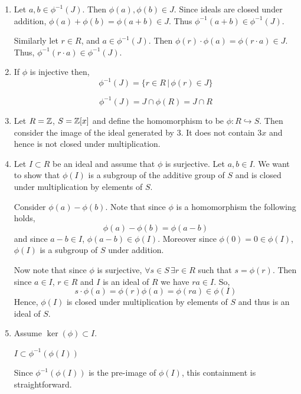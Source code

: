 \documentclass[Notebook.tex]{subfiles}
\begin{document}
\begin{solution}
    \bbni

    \begin{enumerate}[label=(\alph*),ref=\theenumi\alph*]
        \item Let $a, b \in \phi^{-1}(J)$. Then $\phi(a), \phi(b) \in J$. Since ideals are closed under addition, $\phi(a) + \phi(b) = \phi(a+b) \in J$. Thus $\phi^{-1}(a+b) \in \phi^{-1}(J)$. 
        
        Similarly let $r \in R$, and $a \in \phi^{-1}(J)$. Then $\phi(r) \cdot \phi(a)  = \phi(r \cdot a)\in J$. Thus, $\phi^{-1}(r \cdot a) \in \phi^{-1}(J)$. 

        \item If $\phi$ is injective then, 
        \[\phi^{-1}(J) = \{r \in R \, | \, \phi(r) \in J \}\]

        \[\phi^{-1}(J) = J \cap \phi(R) = J \cap R\]

        \item Let $R = \mathbb Z$, $S = \mathbb Z[x]$ and define the homomorphism to be $\phi: R \hookrightarrow S$. Then consider the image of the ideal generated by $3$. It does not contain $3x$ and hence is not closed under multiplication.  
        
        \item Let $I \subset R$ be an ideal and assume that $\phi$ is surjective. Let $a, b \in I$. We want to show that $\phi(I)$ is a subgroup of the additive group of $S$ and is closed under multiplication by elements of $S$. 
        
        Consider $\phi(a) - \phi(b)$. Note that since $\phi$ is a homomorphism the following holds,
        \[\phi(a) - \phi(b) = \phi(a-b)\]
        and since $a-b \in I$, $\phi(a-b) \in \phi(I)$. Moreover since $\phi(0) = 0 \in \phi(I)$, $\phi(I)$ is a subgroup of $S$ under addition. 

        Now note that since $\phi$ is surjective, $\forall s \in S \, \exists r \in R$ such that $s = \phi(r)$. Then since $a \in I$, $r \in R$ and $I$ is an ideal of $R$ we have $ra \in I$. So, 
        \[s \cdot \phi(a) = \phi(r) \phi(a) = \phi (ra) \in \phi(I) \]
        Hence, $\phi(I)$ is closed under multiplication by elements of $S$ and thus is an ideal of $S$.
        
        \item Assume $\ker(\phi) \subset I$. 
        
        $I \subset \phi^{-1}(\phi(I))$

        Since $\phi^{-1}(\phi(I))$ is the pre-image of $\phi(I)$, this containment is straightforward.


\end{enumerate}
\end{solution}
\end{document}
